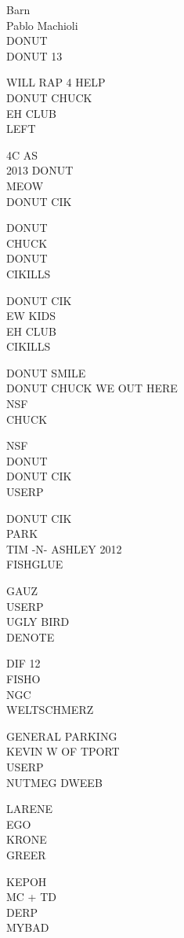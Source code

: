 \documentclass[10pt,letterpaper]{article}
\begin{document}
Barn\\
Pablo Machioli\\
DONUT\\
DONUT 13

WILL RAP 4 HELP\\
DONUT CHUCK\\
EH CLUB\\
LEFT

4C AS\\
2013 DONUT\\
MEOW\\
DONUT CIK

DONUT\\
CHUCK\\
DONUT\\
CIKILLS

DONUT CIK\\
EW KIDS\\
EH CLUB\\
CIKILLS

DONUT SMILE\\
DONUT CHUCK WE OUT HERE\\
NSF\\
CHUCK

NSF\\
DONUT\\
DONUT CIK\\
USERP

DONUT CIK\\
PARK\\
TIM {-}N{-} ASHLEY 2012\\
FISHGLUE

GAUZ\\
USERP\\
UGLY BIRD\\
DENOTE

DIF 12\\
FISHO\\
NGC\\
WELTSCHMERZ

GENERAL PARKING\\
KEVIN W OF TPORT\\
USERP\\
NUTMEG DWEEB

LARENE\\
EGO\\
KRONE\\
GREER

KEPOH\\
MC + TD\\
DERP\\
MYBAD
\end{document}
